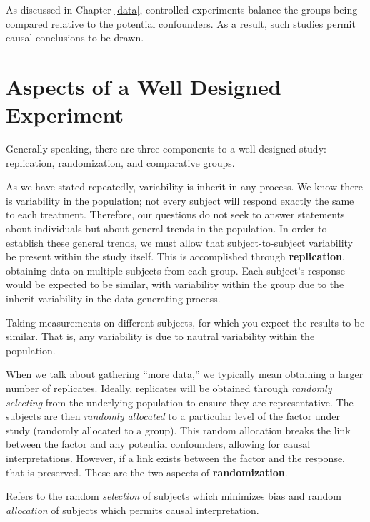 \documentclass[]{book}
\theoremstyle{definition}
\theoremstyle{definition}
\theoremstyle{remark}
\let\BeginKnitrBlock\begin \let\EndKnitrBlock\end
\begin{document}
As discussed in Chapter \ref{data}, controlled experiments balance the
groups being compared relative to the potential confounders. As a
result, such studies permit causal conclusions to be drawn.

\section{Aspects of a Well Designed
Experiment}\label{aspects-of-a-well-designed-experiment}

Generally speaking, there are three components to a well-designed study:
replication, randomization, and comparative groups.

As we have stated repeatedly, variability is inherit in any process. We
know there is variability in the population; not every subject will
respond exactly the same to each treatment. Therefore, our questions do
not seek to answer statements about individuals but about general trends
in the population. In order to establish these general trends, we must
allow that subject-to-subject variability be present within the study
itself. This is accomplished through \textbf{replication}, obtaining
data on multiple subjects from each group. Each subject's response would
be expected to be similar, with variability within the group due to the
inherit variability in the data-generating process.

\BeginKnitrBlock{definition}[Replication]
\protect\hypertarget{def:defn-replication}{}{\label{def:defn-replication}
{} }Taking measurements on different subjects,
for which you expect the results to be similar. That is, any variability
is due to nautral variability within the population.
\EndKnitrBlock{definition}

When we talk about gathering ``more data,'' we typically mean obtaining
a larger number of replicates. Ideally, replicates will be obtained
through \emph{randomly selecting} from the underlying population to
ensure they are representative. The subjects are then \emph{randomly
allocated} to a particular level of the factor under study (randomly
allocated to a group). This random allocation breaks the link between
the factor and any potential confounders, allowing for causal
interpretations. However, if a link exists between the factor and the
response, that is preserved. These are the two aspects of
\textbf{randomization}.

\BeginKnitrBlock{definition}[Randomization]
\protect\hypertarget{def:defn-randomization}{}{\label{def:defn-randomization}
{} }Refers to the random \emph{selection} of
subjects which minimizes bias and random \emph{allocation} of subjects
which permits causal interpretation.
\EndKnitrBlock{definition}
\end{document}
